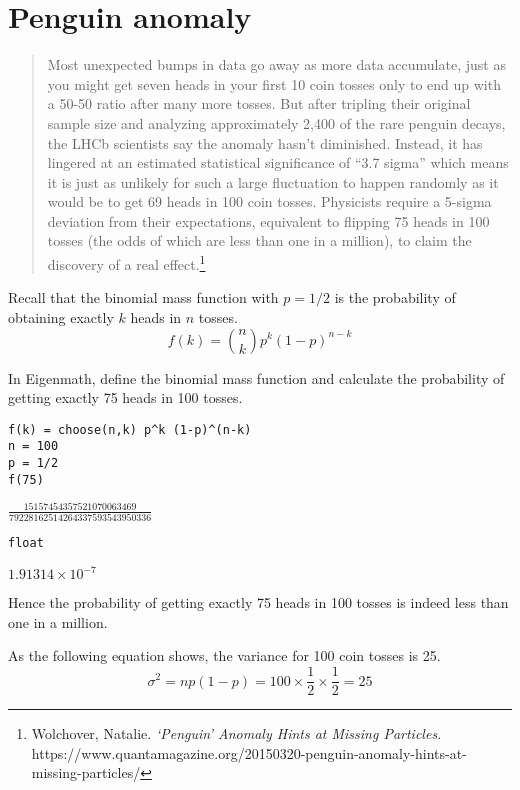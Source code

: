 

\section*{Penguin anomaly}

\begin{quote}
Most unexpected bumps in data go away as more data accumulate, just as you might get seven heads in your first 10 coin tosses only to end up with a 50-50 ratio after many more tosses. But after tripling their original sample size and analyzing approximately 2,400 of the rare penguin decays, the LHCb scientists say the anomaly hasn't diminished. Instead, it has lingered at an estimated statistical significance of ``3.7 sigma'' which means it is just as unlikely for such a large fluctuation to happen randomly as it would be to get 69 heads in 100 coin tosses. Physicists require a 5-sigma deviation from their expectations, equivalent to flipping 75 heads in 100 tosses (the odds of which are less than one in a million), to claim the discovery of a real effect.\footnote{
Wolchover, Natalie.
{\it `Penguin' Anomaly Hints at Missing Particles.}
https://www.quantamagazine.org/20150320-penguin-anomaly-hints-at-missing-particles/}
\end{quote}

Recall that the binomial mass function with $p=1/2$
is the probability of obtaining exactly
$k$ heads in $n$ tosses.
\begin{equation*}
f(k)={n\choose k}p^k(1-p)^{n-k}
\end{equation*}

In Eigenmath, define the binomial mass function
and calculate the probability
of getting exactly 75 heads in 100 tosses.

{\color{blue}
\begin{verbatim}
f(k) = choose(n,k) p^k (1-p)^(n-k)
n = 100
p = 1/2
f(75)
\end{verbatim}}

$\frac{15157454357521070063469}{79228162514264337593543950336}$

{\color{blue}
\begin{verbatim}
float
\end{verbatim}}

$1.91314\times10^{-7}$

\bigskip
Hence the probability of getting exactly 75 heads in 100 tosses is indeed
less than one in a million.

\bigskip
As the following equation shows, the variance for 100 coin tosses is 25.
\begin{equation*}
\sigma^2=np(1-p)=100\times\frac{1}{2}\times\frac{1}{2}=25
\end{equation*}

